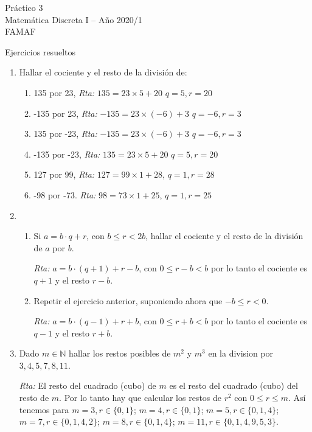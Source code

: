 \documentclass[12pt,spanish,makeidx]{amsbook}
\newcommand{\rta}{\noindent\textit{Rta: }}
\begin{document}
	
{\bf \begin{center} Práctico 3 \\ Matemática Discreta I -- Año 2020/1 \\ FAMAF \end{center}}

{\bf \begin{center} Ejercicios resueltos \end{center}}

\smallskip
\begin{enumerate}

\item Hallar el cociente y el resto de la divisi\'on de:
\begin{enumerate}
\item 
135 por 23, \rta $135= 23\times 5 +20$ $q=5, r=20$
\item
-135 por 23, \rta $-135= 23\times (-6) +3$ $q=-6, r=3$
\item
135 por -23, \rta $ -135= 23\times (-6) +3$ $q=-6, r=3$
\item
-135 por -23, \rta $135= 23\times 5 +20$ $q=5, r=20$
\item
127 por 99, \rta $127=99\times1+28$, $q=1, r=28$
\item
-98 por -73. \rta $ 98=73\times 1+25$, $q=1, r=25$
\end{enumerate}
\smallskip

\item 
\begin{enumerate}
	\item Si $a=b\cdot q+r$, con $b \le r <2 b$, hallar el cociente y el resto de la divisi\'on de $a$ por $b$.
	
	\rta $a = b \cdot (q+1) + r-b$, con $0 \le r-b < b$ por lo tanto el cociente es $q+1$ y el resto  $r-b$.
	
	
	\item Repetir el ejercicio anterior, suponiendo ahora que $-b \le r < 0$.  
	
	\rta  $a = b \cdot (q-1) + r+b$, con $0 \le r+b < b$ por lo tanto el cociente es $q-1$ y el resto  $r+b$.
\end{enumerate}


\smallskip
\item Dado $m\in \mathbb N$ hallar los restos posibles de $m^2$ y $m^3$ en la division por $3,4,5,7,8, 11$.


\rta El resto del cuadrado (cubo)  de $m$ es el resto del cuadrado (cubo)  del resto de $m$.
Por lo tanto hay que calcular los restos de $r^2$ con $0\le r\le m$.
Así tenemos para $m=3, r\in\{0, 1\}$; $m=4, r\in\{0,1\}$; $m=5, r\in\{0,1,4\}$; $m=7,r\in\{0,1,4,2\}$;
$m=8, r\in\{0,1,4\}$; $m=11, r\in\{0,1,4,9,5,3\}$.


\end{enumerate}
\end{document}
